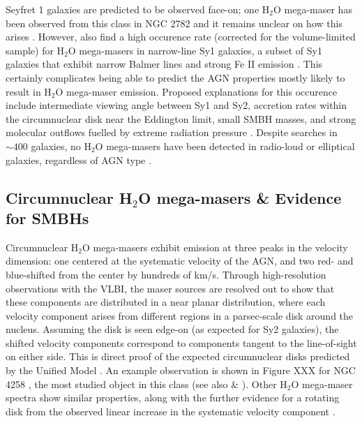 Seyfret 1 galaxies are predicted to be observed face-on; one H$_2$O mega-maser has been observed from this class in NGC 2782 and it remains unclear on how this arises \citep{Tarchi_2011}. However, \citet{Tarchi_2011} also find a high occurence rate (corrected for the volume-limited sample) for H$_2$O mega-masers in narrow-line Sy1 galaxies, a subset of Sy1 galaxies that exhibit narrow Balmer lines and strong Fe II emission \citep{tarchi2012}. This certainly complicates being able to predict the AGN properties mostly likely to result in H$_2$O mega-maser emission. Proposed explanations for this occurence include intermediate viewing angle between Sy1 and Sy2, accretion rates within the circumnuclear disk near the Eddington limit, small SMBH masses, and strong molecular outflows fuelled by extreme radiation pressure \citep{tarchi2012}. Despite searches in $\sim 400$ galaxies, no H$_2$O mega-masers have been detected in radio-loud or elliptical galaxies, regardless of AGN type \citep{tarchi2012}. 


\subsection{Circumnuclear H$_2$O mega-masers \& Evidence for SMBHs}
\label{sub:h20_agn}

Circumnuclear H$_2$O mega-masers exhibit emission at three peaks in the velocity dimension: one centered at the systematic velocity of the AGN, and two red- and blue-shifted from the center by hundreds of km/s. Through high-resolution observations with the VLBI, the maser sources are resolved out to show that these components are distributed in a near planar distribution, where each velocity component arises from different regions in a parsec-scale disk around the nucleus. Assuming the disk is seen edge-on (as expected for Sy2 galaxies), the shifted velocity components correspond to components tangent to the line-of-sight on either side. This is direct proof of the expected circumnuclear disks predicted by the Unified Model \citep{lo2005}. An example observation is shown in Figure XXX for NGC 4258 \citep{Bragg_2000}, the most studied object in this class (see also \citet{Miyoshi_1994} \& \citet{Herrnstein_1999}). Other H$_2$O mega-maser spectra show similar properties, along with the further evidence for a rotating disk from the observed linear increase in the systematic velocity component \citep{lo2005}.  


